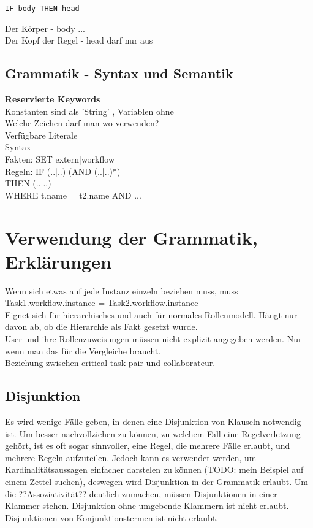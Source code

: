 \begin{verbatim}
IF body THEN head
\end{verbatim}

Der Körper - body ...\\
Der Kopf der Regel - head darf nur aus 

\subsection{Grammatik - Syntax und Semantik}

\textbf{Reservierte Keywords}\\




Konstanten sind als 'String' , Variablen ohne \\
Welche Zeichen darf man wo verwenden?\\
Verfügbare Literale\\
Syntax\\
Fakten: SET extern|workflow \\
Regeln: 	IF (..|..) (AND (..|..)*) \\
THEN (..|..) \\
WHERE t.name = t2.name AND  ...\\


%
%
\section{Verwendung der Grammatik, Erklärungen}
Wenn sich etwas auf jede Instanz einzeln beziehen muss, muss Task1.workflow.instance = Task2.workflow.instance\\
Eignet sich für hierarchisches und auch für normales Rollenmodell. Hängt nur davon ab, ob die Hierarchie als Fakt gesetzt wurde.\\
User und ihre Rollenzuweisungen müssen nicht explizit angegeben werden. Nur wenn man das für die Vergleiche braucht.\\
Beziehung zwischen critical task pair und collaborateur.
\subsection{Disjunktion}
\label{sec:disjunction}
Es wird wenige Fälle geben, in denen eine Disjunktion von Klauseln notwendig ist. Um besser nachvollziehen zu können, zu welchem Fall eine Regelverletzung gehört, ist es oft sogar sinnvoller, eine Regel, die mehrere Fälle erlaubt, und mehrere Regeln aufzuteilen. Jedoch kann es verwendet werden, um Kardinalitätsaussagen einfacher darstelen zu können (TODO: mein Beispiel auf einem Zettel suchen), deswegen wird Disjunktion in der Grammatik erlaubt. Um die ??Assoziativität?? deutlich zumachen, müssen Disjunktionen in einer Klammer stehen. Disjunktion ohne umgebende Klammern ist nicht erlaubt. Disjunktionen von Konjunktionstermen ist nicht erlaubt.

